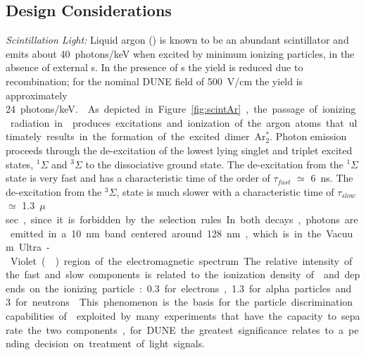 \subsection{Design Considerations}
\label{sec:fdsp-pd-des-consid}

\emph{Scintillation Light:} Liquid argon (\lar) is known to be an abundant scintillator and emits about \SI{40}{photons/keV} when excited  by minimum ionizing particles\cite{Doke:1990rza},
in the absence of external \efield{}s. In the presence of \efield{}s the yield is reduced due to recombination; for the nominal DUNE  field of \SI{500}{V/cm} the yield is approximately \SI{24}{photons/keV.}~\cite{PhysRevB.20.3486}. 

As depicted in Figure~\ref{fig:scintAr}, the passage of ionizing radiation in \lar produces excitations and ionization of the argon atoms that ultimately results in the formation of the excited dimer Ar$^*_2$.  
Photon emission proceeds through the de-excitation of the lowest lying singlet and triplet excited states, $^{1}\Sigma$ and 
$^{3}\Sigma$ to the dissociative ground state. The de-excitation from the $^{1}\Sigma$ state is very fast and has a characteristic time of the order of 
$\tau_{fast}$ $\simeq$ \SI{6}{ns}. The de-excitation from the $^{3}\Sigma$, state is much slower with a characteristic time of $\tau_{slow}$ $\simeq$ \SI{1.3}{$\mu$sec}, since it is forbidden by the selection rules. 
In both decays, photons are emitted in a \SI{10}{nm} band centered around \SI{128}{nm}, which is in the Vacuum Ultra-Violet () region of the electromagnetic spectrum.
The relative intensity of the  fast and slow components is related to the ionization density of \lar and depends on the ionizing particle: \num{0.3} for electrons, \num{1.3} for alpha particles and \num{3} for neutrons~\cite{PhysRevB.27.5279}.
This phenomenon is the basis for the  particle discrimination capabilities of \lar exploited by many experiments that have the capacity to separate the two components, for DUNE the greatest significance relates to a pending decision on treatment of light signals.

